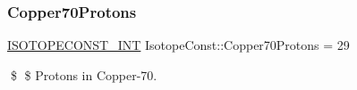 \subsubsection{\texorpdfstring{Copper70\+Protons}{Copper70Protons}}
{\footnotesize\ttfamily \mbox{\hyperlink{group___isotope_const-_macros_ga5f18360b3e99483a35c32d789e62621c}{I\+S\+O\+T\+O\+P\+E\+C\+O\+N\+S\+T\+\_\+\+I\+NT}} Isotope\+Const\+::\+Copper70\+Protons = 29}

\$ \$ Protons in Copper-\/70. 